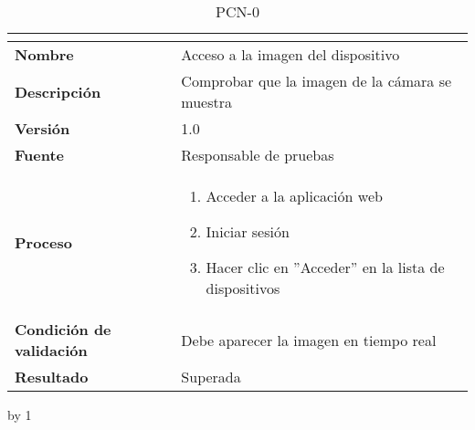 \begin{table}[H]
	\caption{PCN-0\number\pcn}
	\begin{tabular}{|l|p{}|}
		\hline
		\multicolumn{2}{|c|}{\cellcolor[HTML]{BFBFBF}{\color[HTML]{000000} \textbf{PCN-0\number\pcn}}} \\ \hline
		\textbf{Nombre}                  & Acceso a la imagen del dispositivo              \\ \hline
		\textbf{Descripción}             & Comprobar que la imagen de la cámara se muestra \\ \hline
		\textbf{Versión}                 & 1.0                                             \\ \hline
		\textbf{Fuente}                  & Responsable de pruebas                          \\ \hline
		\textbf{Proceso}                 & \begin{enumerate}
			\item Acceder a la aplicación web
			\item Iniciar sesión
			\item Hacer clic en ''Acceder'' en la lista de dispositivos
		\end{enumerate}                      \\ \hline
		\textbf{Condición de validación} & Debe aparecer la imagen en tiempo real          \\ \hline
		\textbf{Resultado}               & Superada                                        \\ \hline
	\end{tabular}
\end{table}
\advance\pcn by 1
